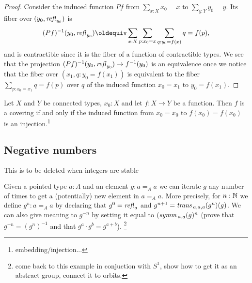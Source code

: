 {{\begin{proof}
Consider the induced function $Pf$ from $\sum_{x:X}x_0=x$ to $\sum_{y:Y}y_0=y$.  Its fiber over $(y_0,\mathop{{\it refl}_{y_0}})$ is 
$$(Pf)^{-1}(y_0,\refl{y_0})\oldequiv\sum_{x:X}\sum_{p:x_0=x}\sum_{q:y_0=f(x)}q=f(p),$$ and is contractible since it is the fiber of a function of contractible types.  We see that the projection $(Pf)^{-1}(y_0,\mathop{{\it refl}_{y_0}})\to f^{-1}(y_0)$ is an equivalence once we notice that the fiber over $(x_1,q:y_0=f(x_1)) $ is equivalent to the fiber $\sum_{p:x_0=x_1}q=f(p)$ over $q$ of the induced function $x_0=x_1$ to $y_0=f(x_1)$.
\end{proof}
\begin{lemma}
  Let $X$ and $Y$ be connected types, $x_0:X$ and let $f:X\to Y$ be a function.  Then $f$ is a covering if and only if the induced function from $x_0=x_0$ to $f(x_0)=f(x_0)$ is an injection.\footnote{embedding/injection...}
\end{lemma}



\subsection{Negative numbers}
This is to be deleted when integers are stable

 \begin{example}%
   Given a pointed type $a:A$ and an element $g: a=_Aa$ we can iterate $g$ any number of times to get a (potentially) new element in $a=_Aa$. More precisely, for $n:\mathbb{N}$ we define $g^n:a=_Aa$ by declaring that $g^0=\mathop{{\it refl}_{a}}$ and $g^{n+1}=\mathop{\mathit{trans}}{}_{a,a,a}(g^n)(g)$.  We can also give meaning to $g^{-n}$ by setting it equal to $(\mathop{\mathit{symm}}{}_{a,a}(g)^n$ (prove that $g^{-n}=(g^n)^{-1}$ and that $g^a\cdot g^b=g^{a+b}$).  \footnote{come back to this example in conjuction with $S^1$, show how to get it as an abstract group, connect it to orbits.}


\end{example}}}
